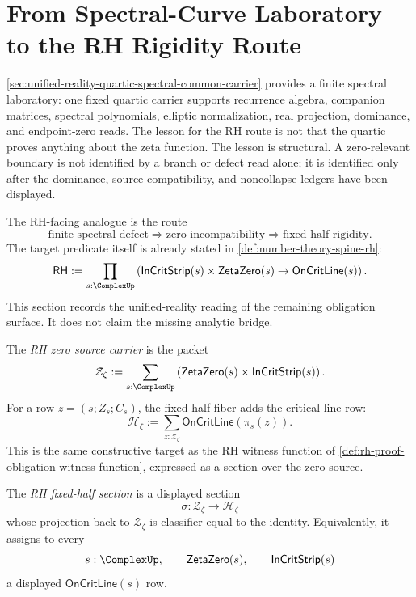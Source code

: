 \section{From Spectral-Curve Laboratory to the RH Rigidity Route}
\label{sec:unified-reality-rh-spectral-rigidity-route}

\autoref{sec:unified-reality-quartic-spectral-common-carrier} provides a
finite spectral laboratory: one fixed quartic carrier supports
recurrence algebra, companion matrices, spectral polynomials, elliptic
normalization, real projection, dominance, and endpoint-zero reads. The
lesson for the RH route is not that the quartic proves anything about
the zeta function. The lesson is structural. A zero-relevant boundary is
not identified by a branch or defect read alone; it is identified only
after the dominance, source-compatibility, and noncollapse ledgers have
been displayed.

The RH-facing analogue is the route
$$
\text{finite spectral defect}
\Rightarrow
\text{zero incompatibility}
\Rightarrow
\text{fixed-half rigidity}.
$$
The target predicate itself is already stated in
\autoref{def:number-theory-spine-rh}:
$$
\mathsf{RH}
:=
\prod_{s:\ComplexUp}
\left(
\mathsf{InCritStrip}(s)\times\mathsf{ZetaZero}(s)
\to
\mathsf{OnCritLine}(s)
\right).
$$
This section records the unified-reality reading of the remaining
obligation surface. It does not claim the missing analytic bridge.

\begin{definition}
\label{def:unified-reality-rh-zero-source-fixed-half-fiber}
The \emph{RH zero source carrier} is the packet
$$
\mathcal Z_{\zeta}
:=
\sum_{s:\ComplexUp}
\left(
\mathsf{ZetaZero}(s)\times\mathsf{InCritStrip}(s)
\right).
$$
For a row $z=(s;Z_s;C_s)$, the fixed-half fiber adds the critical-line
row:
$$
\mathcal H_{\zeta}
:=
\sum_{z:\mathcal Z_{\zeta}}
\mathsf{OnCritLine}(\pi_s(z)).
$$
This is the same constructive target as the RH witness function of
\autoref{def:rh-proof-obligation-witness-function}, expressed as a
section over the zero source.
\end{definition}

\begin{definition}
\label{def:unified-reality-rh-fixed-half-section}
The \emph{RH fixed-half section} is a displayed section
$$
\sigma:\mathcal Z_{\zeta}\to\mathcal H_{\zeta}
$$
whose projection back to $\mathcal Z_{\zeta}$ is classifier-equal to the
identity. Equivalently, it assigns to every
$$
s:\ComplexUp,\qquad
\mathsf{ZetaZero}(s),\qquad
\mathsf{InCritStrip}(s)
$$
a displayed $\mathsf{OnCritLine}(s)$ row.
\end{definition}

